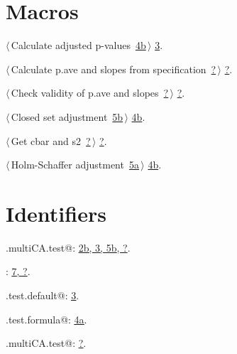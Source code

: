 \documentclass[reqno]{amsart}
\renewcommand{\NWlink}[2]{\hyperlink{#1}{#2}}
\begin{document}
\section{Macros}


{\small\begin{list}{}{\setlength{\itemsep}{-\parsep}\setlength{\itemindent}{-\leftmargin}}
\item $\langle\,$Calculate adjusted p-values\nobreak\ {\footnotesize \NWlink{nuweb4b}{4b}}$\,\rangle$ {\footnotesize {\NWtxtRefIn} \NWlink{nuweb3}{3}.}
\item $\langle\,$Calculate p.ave and slopes from specification\nobreak\ {\footnotesize \NWlink{nuweb?}{?}}$\,\rangle$ {\footnotesize {\NWtxtRefIn} \NWlink{nuweb?}{?}.}
\item $\langle\,$Check validity of p.ave and slopes\nobreak\ {\footnotesize \NWlink{nuweb?}{?}}$\,\rangle$ {\footnotesize {\NWtxtRefIn} \NWlink{nuweb?}{?}.}
\item $\langle\,$Closed set adjustment\nobreak\ {\footnotesize \NWlink{nuweb5b}{5b}}$\,\rangle$ {\footnotesize {\NWtxtRefIn} \NWlink{nuweb4b}{4b}.}
\item $\langle\,$Get cbar and s2\nobreak\ {\footnotesize \NWlink{nuweb?}{?}}$\,\rangle$ {\footnotesize {\NWtxtRefIn} \NWlink{nuweb?}{?}.}
\item $\langle\,$Holm-Schaffer adjustment\nobreak\ {\footnotesize \NWlink{nuweb5a}{5a}}$\,\rangle$ {\footnotesize {\NWtxtRefIn} \NWlink{nuweb4b}{4b}.}
\end{list}}

\section{Identifiers}


{\small\begin{list}{}{\setlength{\itemsep}{-\parsep}\setlength{\itemindent}{-\leftmargin}}
\item \verb@.multiCA.test@: \underline{\NWlink{nuweb2b}{2b}}\NWlink{nuweb3}{, 3}\NWlink{nuweb5b}{, 5b}\NWlink{nuweb?}{, ?}.
\item \verb@cnonct@: \underline{\NWlink{nuweb7}{7}}\NWlink{nuweb?}{, ?}.
\item \verb@multiCA.test.default@: \underline{\NWlink{nuweb3}{3}}.
\item \verb@multiCA.test.formula@: \underline{\NWlink{nuweb4a}{4a}}.
\item \verb@power.multiCA.test@: \underline{\NWlink{nuweb?}{?}}.
\end{list}}
\end{document}
